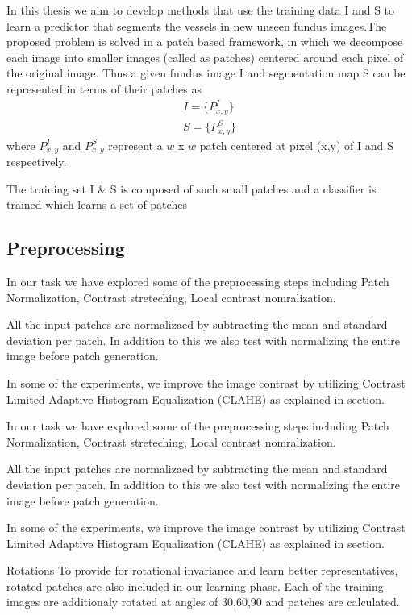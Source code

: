 In this thesis we aim to develop methods that use the training data I and S to learn a predictor that segments the vessels in new unseen fundus images.The proposed problem is solved in a patch based framework, in which we decompose each image into smaller images (called as patches) centered around each pixel of the original image. Thus a given fundus image I and segmentation map S can be represented in terms of their patches as 
\begin{gather}
I = \{ P^I_{x,y} \}  \\
S = \{ P^S_{x,y} \} 
\end{gather}
where $P^I_{x,y}$ and $P^S_{x,y}$ represent a $w $ x $ w$ patch centered at pixel (x,y) of I and S respectively.

The training set I \& S is composed of such small patches and a classifier is trained which learns a set of patches 

\subsection{Preprocessing}
In our task we have explored some of the preprocessing steps including Patch Normalization, Contrast streteching, Local contrast nomralization.

All the input patches are normalizaed by subtracting the mean and standard deviation per patch. In addition to this we also test with normalizing the entire image before patch generation.

In some of the experiments, we improve the image contrast by utilizing Contrast Limited Adaptive Histogram Equalization (CLAHE) as explained in section{}.

In our task we have explored some of the preprocessing steps including Patch Normalization, Contrast streteching, Local contrast nomralization.

All the input patches are normalizaed by subtracting the mean and standard deviation per patch. In addition to this we also test with normalizing the entire image before patch generation.

In some of the experiments, we improve the image contrast by utilizing Contrast Limited Adaptive Histogram Equalization (CLAHE) as explained in section{}.

Rotations
To provide for rotational invariance and learn better representatives, rotated patches are also included in our learning phase. Each of the training images are additionaly rotated at angles of 30,60,90 and patches are calculated.

